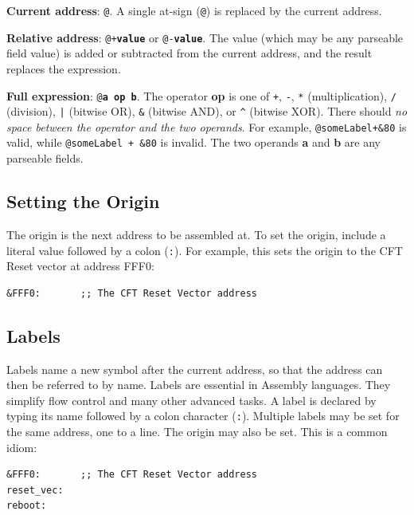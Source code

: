 \documentclass[11pt,a4paper,twocolumns]{article}
\newcommand\f[1]{{\color{black}\texttt{#1}}}
\newcommand\hex[1]{\textsf{#1}}
\begin{document}
\begin{description}

\item{\bf Current address}: \f{@}. A single at-sign (\f{@}) is replaced by the
  current address.

\item{\bf Relative address}: \f{@+{\bf value}} or \f{@-{\bf value}}. The value
  (which may be any parseable field value) is added or subtracted from the
  current address, and the result replaces the expression.

\item{\bf Full expression}: \f{@{\bf a op b}}. The operator {\bf op} is one of
  \f{+}, \f{-}, \f{*} (multiplication), \f{/} (division), \f{|} (bitwise OR),
  \f{\&} (bitwise AND), or \f{\^} (bitwise XOR). There should {\em no space
    between the operator and the two operands}. For example, \f{@someLabel+\&80}
  is valid, while \f{@someLabel + \&80} is invalid. The two operands {\bf a} and
  {\bf b} are any parseable fields.

\end{description}

\subsection{Setting the Origin}

The origin is the next address to be assembled at. To set the origin, include a
literal value followed by a colon (\f{:}). For example, this sets the origin to
the CFT Reset vector at address \hex{FFF0}:

\begin{verbatim}
&FFF0:       ;; The CFT Reset Vector address
\end{verbatim}

\subsection{Labels}

Labels name a new symbol after the current address, so that the address can
then be referred to by name. Labels are essential in Assembly languages. They
simplify flow control and many other advanced tasks. A label is declared by
typing its name followed by a colon character (\f{:}). Multiple labels may be
set for the same address, one to a line. The origin may also be set. This is a
common idiom:

\begin{verbatim}
&FFF0:       ;; The CFT Reset Vector address
reset_vec:
reboot:
\end{verbatim}
\end{document}
